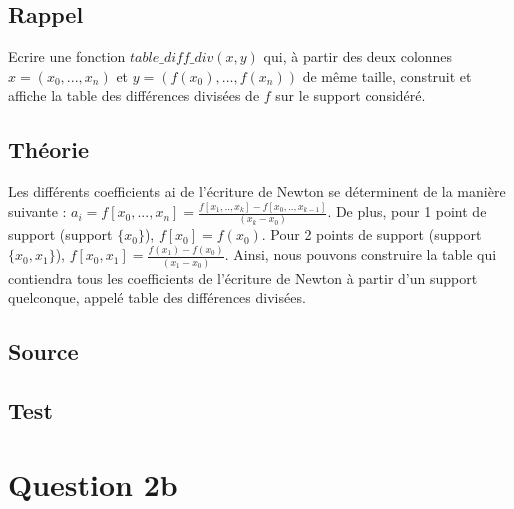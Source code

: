 \documentclass[a4paper,10pt]{report}
\begin{document}
\subsection*{Rappel}

Ecrire une fonction $table\_diff\_div(x, y)$ qui, à partir des deux colonnes $x = (x_{0},...,x_{n})$ et $y = (f(x_{0}),...,f(x_{n}))$ de même taille, construit et affiche la table des différences divisées de $f$ sur le support considéré.

\subsection*{Théorie}

Les différents coefficients ai de l’écriture de Newton se déterminent de la manière suivante : $a_{i} = f[x_{0},...,x_{n}] = \frac{f[x_{1},..,x_{k}]-f[x_{0},..,x_{k-1}]}{(x_{k}-x_{0})}$.
De plus, pour 1 point de support (support $\lbrace x_{0} \rbrace$), $f[x_{0}] = f(x_{0})$.
Pour 2 points de support (support $\lbrace x_{0},x_{1} \rbrace$), $f[x_{0},x_{1}] = \frac{f(x_{1})-f(x_{0})}{(x_{1}-x_{0})}$.
Ainsi, nous pouvons construire la table qui contiendra tous les coefficients de l’écriture de Newton à partir d’un support quelconque, appelé table des différences divisées.

\newpage
\subsection*{Source}

\begin{center}
	
\end{center}

\subsection*{Test}

\begin{center}
	
\end{center}

\section*{Question 2b}
\end{document}
